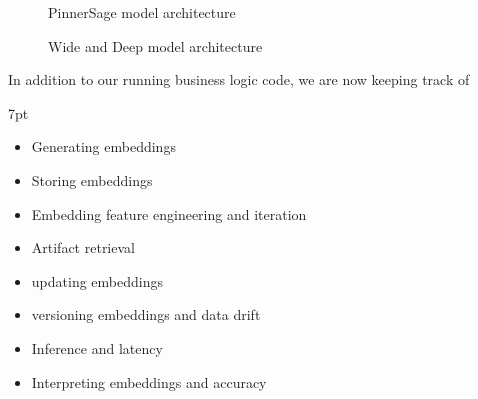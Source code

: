 \documentclass[11pt, table]{diazessay} %
\newenvironment{formal}{%
  \def\FrameCommand{%
    \hspace{1pt}%
    {\color{w_lightblue}\vrule width 2pt}%
    {\color{formalshade}\vrule width 4pt}%
    \colorbox{formalshade}%
  }%
  \MakeFramed{\advance\hsize-\width\FrameRestore}%
  \noindent\hspace{-4.55pt}%
  \begin{adjustwidth}{}{7pt}%
  \vspace{2pt}\vspace{2pt}%
}
{%
  \vspace{2pt}\end{adjustwidth}\endMakeFramed%
}
\begin{document}
\begin{sloppypar}
\begin{figure}[H]
\begin{minipage}[c]{0.5\linewidth}
\caption{PinnerSage model architecture\citep{pal2020pinnersage}}
\end{minipage}
\hfill
\begin{minipage}[c]{0.5\linewidth}
\caption{Wide and Deep model architecture\citep{cheng2016wide}}
\end{minipage}%
\end{figure}

In addition to our running business logic code, we are now keeping track of

\begin{formal}
\begin{itemize}
  \item Generating embeddings 
  \item Storing embeddings
  \item Embedding feature engineering and iteration
  \item Artifact retrieval
  \item updating embeddings 
  \item versioning embeddings and data drift
  \item Inference and latency
  \item Interpreting embeddings and accuracy
\end{itemize}
\end{formal}


\end{sloppypar}
\end{document}
